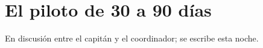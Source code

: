 \section{El piloto de 30 a 90 días}\label{sec:piloto}

En discusión entre el capitán y el coordinador; se escribe esta noche.
